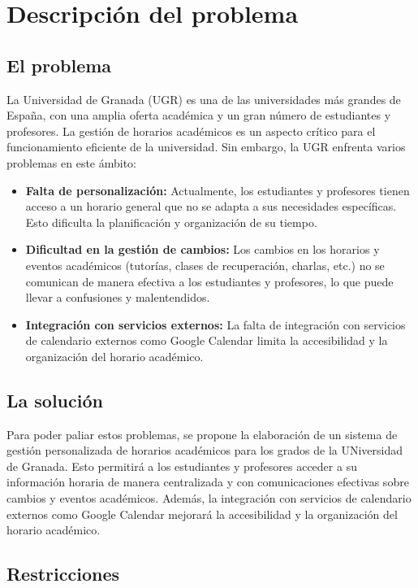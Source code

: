 \chapter{Descripción del problema}\label{cap:descripcion}

\section{El problema}

La Universidad de Granada (UGR) es una de las universidades más grandes de España, con una amplia oferta académica y un gran número de estudiantes y profesores. La gestión de horarios académicos es un aspecto crítico para el funcionamiento eficiente de la universidad. Sin embargo, la UGR enfrenta varios problemas en este ámbito:

\begin{itemize}
    \item \textbf{Falta de personalización:} Actualmente, los estudiantes y profesores tienen acceso a un horario general que no se adapta a sus necesidades específicas. Esto dificulta la planificación y organización de su tiempo.
    \item \textbf{Dificultad en la gestión de cambios:} Los cambios en los horarios y eventos académicos (tutorías, clases de recuperación, charlas, etc.) no se comunican de manera efectiva a los estudiantes y profesores, lo que puede llevar a confusiones y malentendidos.
    \item \textbf{Integración con servicios externos:} La falta de integración con servicios de calendario externos como Google Calendar limita la accesibilidad y la organización del horario académico.
\end{itemize}

\section{La solución}

Para poder paliar estos problemas, se propone la elaboración de un sistema de gestión personalizada de horarios académicos para los grados de la UNiversidad de Granada. 
Esto permitirá a los estudiantes y profesores acceder a su información horaria de manera centralizada y con comunicaciones efectivas sobre cambios y eventos académicos. Además, la integración con servicios de calendario externos como Google Calendar mejorará la accesibilidad y la organización del horario académico.

\section{Restricciones}

